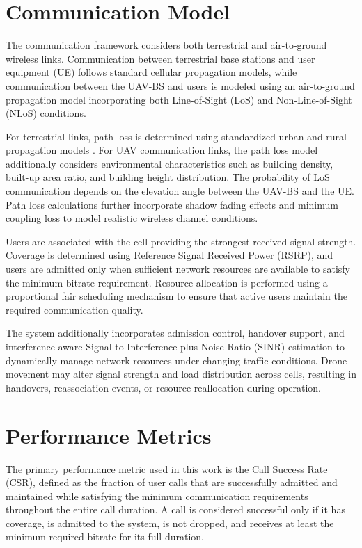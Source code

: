 \documentclass[12pt]{report}
\begin{document}
\section{Communication Model}

The communication framework considers both terrestrial and air-to-ground wireless links. Communication between terrestrial base stations and user equipment (UE) follows standard cellular propagation models, while communication between the UAV-BS and users is modeled using an air-to-ground propagation model incorporating both Line-of-Sight (LoS) and Non-Line-of-Sight (NLoS) conditions.

For terrestrial links, path loss is determined using standardized urban and rural propagation models \cite{3gpp2019channel}. For UAV communication links, the path loss model additionally considers environmental characteristics such as building density, built-up area ratio, and building height distribution. The probability of LoS communication depends on the elevation angle between the UAV-BS and the UE. Path loss calculations further incorporate shadow fading effects and minimum coupling loss to model realistic wireless channel conditions.

Users are associated with the cell providing the strongest received signal strength. Coverage is determined using Reference Signal Received Power (RSRP), and users are admitted only when sufficient network resources are available to satisfy the minimum bitrate requirement. Resource allocation is performed using a proportional fair scheduling mechanism \cite{3gpp2019channel} to ensure that active users maintain the required communication quality.

The system additionally incorporates admission control, handover support, and interference-aware Signal-to-Interference-plus-Noise Ratio (SINR) estimation to dynamically manage network resources under changing traffic conditions. Drone movement may alter signal strength and load distribution across cells, resulting in handovers, reassociation events, or resource reallocation during operation.
\section{Performance Metrics}

The primary performance metric used in this work is the Call Success Rate (CSR), defined as the fraction of user calls that are successfully admitted and maintained while satisfying the minimum communication requirements throughout the entire call duration. A call is considered successful only if it has coverage, is admitted to the system, is not dropped, and receives at least the minimum required bitrate for its full duration.
\end{document}
